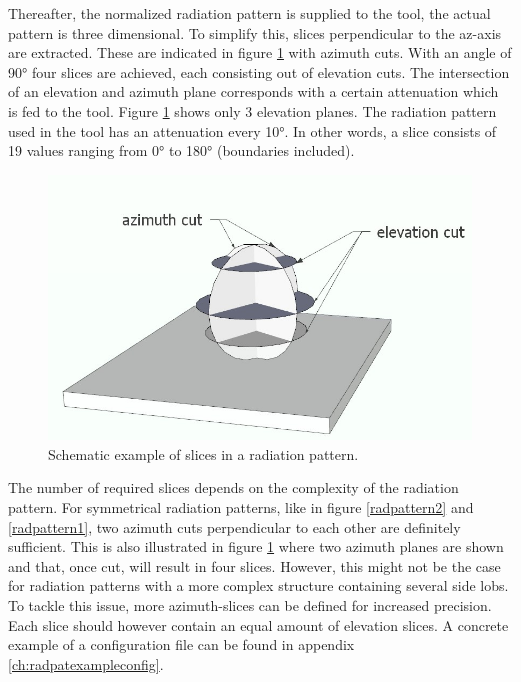 Thereafter, the normalized radiation pattern is supplied to the tool, the actual pattern is three dimensional. To simplify this,
slices perpendicular to the az-axis are extracted. These are indicated in figure \ref{fig:slicesOfPattern} with azimuth cuts. With
an angle of \ang{90} four slices are achieved, each consisting out of elevation cuts. The intersection of an elevation and azimuth plane 
corresponds with a certain attenuation which is fed to the tool. Figure \ref{fig:slicesOfPattern} shows only 3 elevation planes. The radiation pattern used in the tool 
has an attenuation every \ang{10}. In other words, a slice consists of 19 values ranging from \ang{0} to \ang{180} (boundaries included).
\begin{figure}[H]
\centering
  \includegraphics[width=\textwidth/10*6]{../images/3Dimages/slicesOfPattern.jpg}
  \caption{Schematic example of slices in a radiation pattern.}
  \label{fig:slicesOfPattern}
\end{figure}

The number of required slices depends on the complexity of the radiation pattern. For symmetrical radiation patterns, like 
in figure \ref{radpattern2} and \ref{radpattern1}, two azimuth cuts perpendicular to each other
are definitely sufficient. This is also illustrated in figure \ref{fig:slicesOfPattern} where two azimuth planes are shown and that, once cut, will result in four slices.
However, this might not be the case for radiation patterns with a more complex structure containing several  
side lobs. To tackle this issue, more azimuth-slices can be defined for increased precision. Each slice should however contain an equal amount 
of elevation slices.  A concrete example of a configuration file can be found in appendix \ref{ch:radpatexampleconfig}.
 
